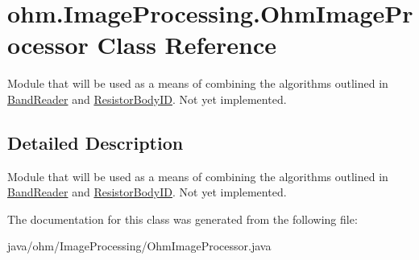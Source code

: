 \hypertarget{classohm_1_1_image_processing_1_1_ohm_image_processor}{}\section{ohm.\+Image\+Processing.\+Ohm\+Image\+Processor Class Reference}
\label{classohm_1_1_image_processing_1_1_ohm_image_processor}


Module that will be used as a means of combining the algorithms outlined in \hyperlink{classohm_1_1_image_processing_1_1_band_reader}{Band\+Reader} and \hyperlink{classohm_1_1_image_processing_1_1_resistor_body_i_d}{Resistor\+Body\+ID}. Not yet implemented.  




\subsection{Detailed Description}
Module that will be used as a means of combining the algorithms outlined in \hyperlink{classohm_1_1_image_processing_1_1_band_reader}{Band\+Reader} and \hyperlink{classohm_1_1_image_processing_1_1_resistor_body_i_d}{Resistor\+Body\+ID}. Not yet implemented. 

The documentation for this class was generated from the following file\+:\begin{DoxyCompactItemize}
\item 
java/ohm/\+Image\+Processing/Ohm\+Image\+Processor.\+java\end{DoxyCompactItemize}
